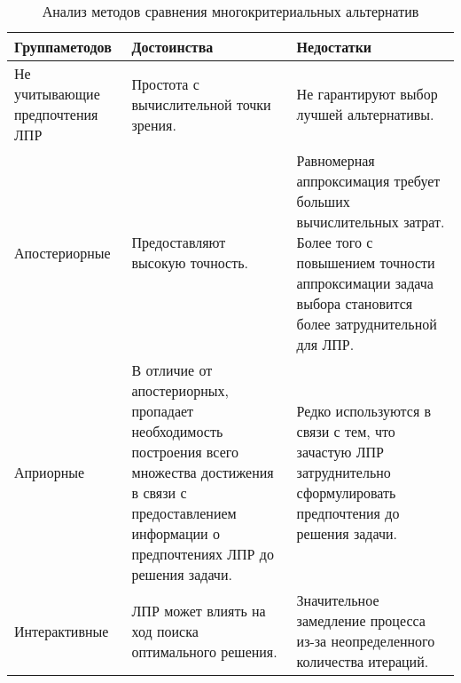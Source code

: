 \newpage
\begin{table}[H]
	\centering
	\caption{Анализ методов сравнения многокритериальных альтернатив}
	\label{pos_neg}
	\begin{tabular}{|p{3.3cm}|p{5.9cm}|p{6.0cm}|}
		\hline
		\textbf{Группа\linebreak методов} & \textbf{Достоинства} & \textbf{Недостатки}\\
		\hline
		Не учитывающие предпочтения ЛПР & Простота с вычислительной точки зрения. & Не гарантируют выбор лучшей альтернативы.\\
		\hline
		Апостериорные & Предоставляют высокую точность. & Равномерная аппроксимация требует больших вычислительных затрат. Более того с повышением точности аппроксимации задача выбора становится более затруднительной для ЛПР.\\
		\hline
		Априорные & В отличие от апостериорных, пропадает необходимость построения всего множества достижения в связи с предоставлением информации о предпочтениях ЛПР до решения задачи. & Редко используются в связи с тем, что зачастую ЛПР затруднительно сформулировать предпочтения до решения задачи.\\
		\hline
		Интерактивные & ЛПР может влиять на ход поиска оптимального решения. & Значительное замедление процесса из-за неопределенного количества итераций.\\
		\hline
	\end{tabular}
\end{table}